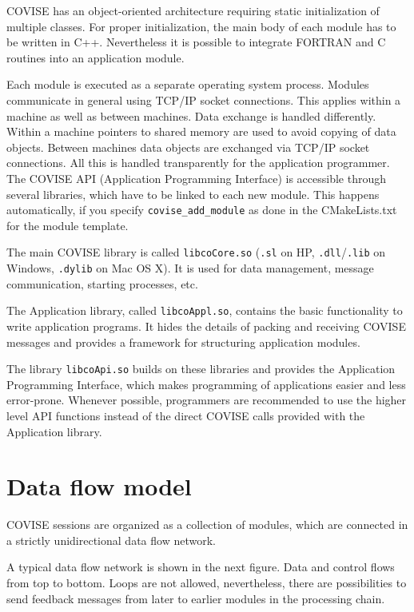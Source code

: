COVISE has an object-oriented architecture requiring static initialization of 
multiple classes. For proper initialization, the main body of each module has to be 
written in C++. Nevertheless it is possible to integrate FORTRAN and C routines into 
an application module. 

Each module is executed as a separate operating system process.
Modules communicate in general 
using TCP/IP socket connections.
This applies within a machine as well as between 
machines.
Data exchange is handled differently. Within a machine pointers to shared 
memory are used  to avoid copying of data objects. Between machines data objects are 
exchanged via TCP/IP socket connections. All this is handled transparently  for  
the application programmer.
The COVISE API (Application Programming Interface) is 
accessible through several libraries, which have to be linked to each new module. 
This happens automatically, if you specify \texttt{covise\_add\_module} as done
in the CMakeLists.txt for the module template.

The main COVISE library is called {\tt libcoCore.so}
({\tt .sl} on HP, \texttt{.dll}/\texttt{.lib} on Windows, \texttt{.dylib} on Mac OS X).
It is used for data management, message communication, starting processes, etc.

The Application library, called {\tt libcoAppl.so}, contains the basic functionality to 
write application programs. It hides the details of packing and receiving COVISE 
messages and provides a framework for structuring application modules.

The library {\tt libcoApi.so} builds on these libraries and provides the
Application Programming Interface, which makes programming of applications
easier and less error-prone.
Whenever possible, programmers are recommended to use the higher level API
functions instead of the direct COVISE calls provided with the Application library.

\section{Data flow model}
\latexonly
{}
\endlatexonly

COVISE sessions are organized as a collection of modules, which are connected in a 
strictly unidirectional data flow network.

A typical data flow network is shown in the next figure.  Data and control flows from top to 
bottom. Loops are not allowed, nevertheless, there are possibilities to send feedback 
messages from later to earlier modules in the processing chain.

